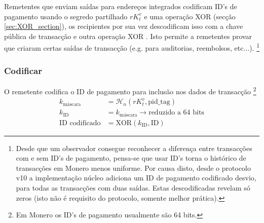Remetentes que enviam saídas para endereços integrados codificam ID's de pagamento usando o segredo partilhado $r K_t^v$ e uma operação XOR (secção \ref{sec:XOR_section}), os recipientes por sua vez descodificam isso com a chave pública de transacção e outra operação XOR \cite{integrated-addresses}. Isto permite a remetentes provar que criaram certas saídas de transacção (e.g. para auditorias, reembolsos, etc...).   
\footnote{Desde que um observador consegue reconhecer a diferença entre transacções com e sem ID's de pagamento, pensa-se que usar ID's torna o histórico de transacções em Monero menos uniforme. Por causa disto, desde o protocolo v10 a implementação núcleo adiciona um ID de pagamento codificado desvio, para todas as transacções com duas saídas. Estas descodificadas revelam só zeros (isto não é requisito do protocolo, somente melhor prática).}


\subsubsection*{Codificar}

O remetente codifica o ID de pagamento para inclusão nos dados de transacção
\footnote{Em Monero os ID's de pagamento usualmente são 64 bits.} 
\vspace{.175cm}
\begin{align*}
         k_{\textrm{máscara}} &= \mathcal{H}_n(r K_t^v,\textrm{pid\_tag}) \\
      k_{\textrm{ID}} &= k_{\textrm{máscara}} \rightarrow \textrm{reduzido a 64 bits}\\
  \textrm{ID codificado} &= \textrm{XOR}(k_{\textrm{ID}}, \textrm{ID})
\end{align*}

